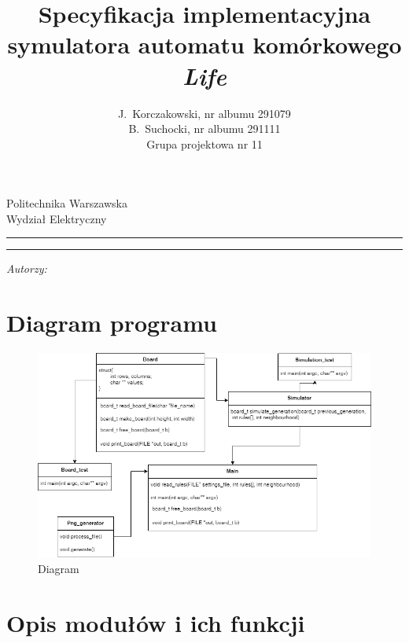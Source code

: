 \documentclass[a4paper,11pt, notitlepage ]{article}
\author{J.~Korczakowski, nr albumu 291079\\ B.~Suchocki, nr albumu 291111\\ Grupa projektowa nr 11}
\title{Specyfikacja implementacyjna symulatora automatu komórkowego \textsl{Life}}
\makeatletter
\newcommand{\linia}{\rule{\linewidth}{0.4mm}}
\renewcommand{\maketitle}{\begin{titlepage}
    \vspace*{1cm}
    \begin{center}\small
    Politechnika Warszawska\\
    Wydział Elektryczny
    \end{center}
    \vspace{3cm}
    \noindent\linia
    \begin{center}
      \LARGE \textsc{\@title}
         \end{center}
     \linia
    \vspace{0.5cm}
    \begin{flushright}
    \begin{minipage}{8cm}
    \textit{\small Autorzy:}\\
    \normalsize \textsc{\@author} \par
    \end{minipage}
    \end{flushright}
    \vspace*{\stretch{6}}
    \begin{center}
    \@date
    \end{center}
  \end{titlepage}%
}
\makeatother
\begin{document}
\maketitle
\setcounter{page}{2}
\section{Diagram programu}
\begin{figure}[h]
\centering
\includegraphics[width=13cm]{Modules_diagram}
\caption{Diagram}
\end{figure}



\section{Opis modułów i ich funkcji}
\end{document}
